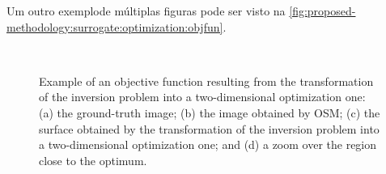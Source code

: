 		Um outro exemplode múltiplas figuras pode ser visto na \autoref{fig:proposed-methodology:surrogate:optimization:objfun}.
		\begin{figure}[!h]
			\centering
			 \hspace{.05\textwidth}
			 \\
			 \hspace{.05\textwidth}
			\caption[Example of an objective function resulting from the transformation of the inversion problem into a two-dimensional optimization one.]{Example of an objective function resulting from the transformation of the inversion problem into a two-dimensional optimization one: (a) the ground-truth image; (b) the image obtained by OSM; (c) the surface obtained by the transformation of the inversion problem into a two-dimensional optimization one; and (d) a zoom over the region close to the optimum.}
			\label{fig:proposed-methodology:surrogate:optimization:objfun}
		\end{figure}

